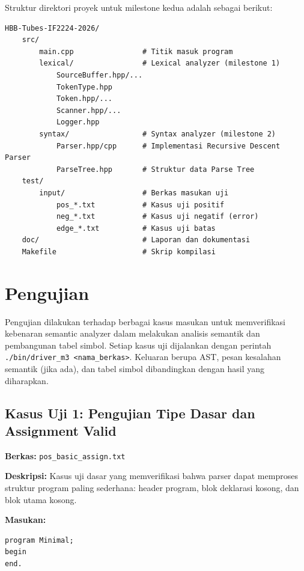 ﻿\documentclass[12pt,a4paper]{article}
\begin{document}
Struktur direktori proyek untuk milestone kedua adalah sebagai berikut:

\begin{lstlisting}[style=bash, caption={Tata letak direktori proyek}]
HBB-Tubes-IF2224-2026/
    src/
        main.cpp                # Titik masuk program
        lexical/                # Lexical analyzer (milestone 1)
            SourceBuffer.hpp/...
            TokenType.hpp
            Token.hpp/...
            Scanner.hpp/...
            Logger.hpp
        syntax/                 # Syntax analyzer (milestone 2)
            Parser.hpp/cpp      # Implementasi Recursive Descent Parser
            ParseTree.hpp       # Struktur data Parse Tree
    test/
        input/                  # Berkas masukan uji
            pos_*.txt           # Kasus uji positif
            neg_*.txt           # Kasus uji negatif (error)
            edge_*.txt          # Kasus uji batas
    doc/                        # Laporan dan dokumentasi
    Makefile                    # Skrip kompilasi
\end{lstlisting}


\section{Pengujian}

Pengujian dilakukan terhadap berbagai kasus masukan untuk memverifikasi kebenaran semantic analyzer dalam melakukan analisis semantik dan pembangunan tabel simbol. Setiap kasus uji dijalankan dengan perintah \texttt{./bin/driver\_m3 <nama\_berkas>}. Keluaran berupa AST, pesan kesalahan semantik (jika ada), dan tabel simbol dibandingkan dengan hasil yang diharapkan.

\subsection{Kasus Uji 1: Pengujian Tipe Dasar dan Assignment Valid}
\textbf{Berkas:} \texttt{pos\_basic\_assign.txt}

\textbf{Deskripsi:} Kasus uji dasar yang memverifikasi bahwa parser dapat memproses struktur program paling sederhana: header program, blok deklarasi kosong, dan blok utama kosong.

\textbf{Masukan:}
\begin{lstlisting}[style=default]
program Minimal;
begin
end.
\end{lstlisting}
\end{document}
